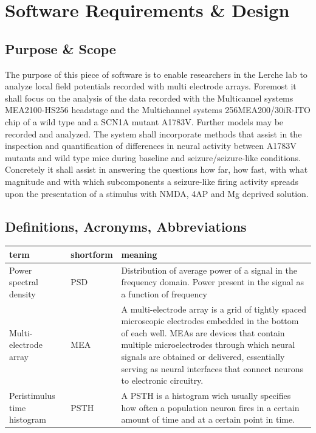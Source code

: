 \documentclass[a4paper]{article}
\begin{document}
\section{Software Requirements \& Design}
	\subsection{Purpose \& Scope}
		The purpose of this piece of software is to enable researchers in the Lerche lab to analyze local field potentials recorded with multi electrode arrays. 
		Foremost it shall focus on the analysis of the data recorded with the Multicannel systems MEA2100-HS256 headstage and the Multichannel systems 256MEA200/30iR-ITO chip of a wild type and a SCN1A mutant A1783V. 
		Further models may be recorded and analyzed. 
		The system shall incorporate methods that assist in the inspection and quantification of differences in neural activity between A1783V mutants and wild type mice during baseline and seizure/seizure-like conditions. 
		Concretely it shall assist in answering the questions how far, how fast, with what magnitude and with which subcomponents a seizure-like firing activity spreads upon the presentation of a stimulus with NMDA, 4AP and Mg deprived solution.
	
    \subsection{Definitions, Acronyms, Abbreviations}
	\begin{longtable}{>{\raggedright \arraybackslash}p{}
	>{\raggedright \arraybackslash}p{}>{\raggedright \arraybackslash}p{}} \toprule
	term & shortform & meaning \\ \midrule
	Power spectral density &  PSD & Distribution of average power of a signal in the frequency domain. Power present in the signal as a function of frequency \\
	Multi-electrode array & MEA & A multi-electrode array is a grid of tightly spaced microscopic electrodes embedded in the bottom of each well. MEAs are devices that contain multiple microelectrodes through which neural signals are obtained or delivered, essentially serving as neural interfaces that connect neurons to electronic circuitry.  \\
    Peristimulus time histogram & PSTH & A PSTH is a histogram wich usually specifies how often a population neuron fires in a certain amount of time and at a certain point in time. \\ \bottomrule
	\end{longtable}
	
\end{document}
